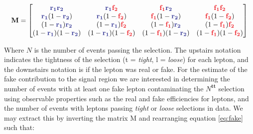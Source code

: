 \begin{equation}
\mathbf{M} = 
\begin{bmatrix}

\rone \rtwo          & \rone \ftwo         & \fone \rtwo         & \fone \ftwo \\
\rone (1-\rtwo )     & \rone (1-\ftwo )    & \fone (1- \rtwo )   & \fone (1- \ftwo ) \\
(1-\rone )\rtwo      & (1-\rone )\ftwo     & (1-\fone )\rtwo     & (1-\fone )\ftwo  \\
(1-\rone )(1-\rtwo ) & (1-\rone )(1-\ftwo )& (1-\fone )(1-\rtwo )& (1-\fone )(1-\ftwo )\\

\end{bmatrix}
\end{equation}

Where $N$ is the number of events passing the selection. The upstairs notation indicates the tightness of the selection (t = \emph{tight}, l = \emph{loose}) for each lepton, and the downstairs notation is if the lepton was real or fake. For the estimate of the fake contribution to the signal region we are interested in determining the number of events with at least one fake lepton contaminating the $N^{\mathbf{tt}}$ selection using observable properties such as the real and fake efficiencies for leptons, and the number of events with leptons passing \emph{tight} or \emph{loose} selections in data. We may extract this by inverting the matrix M and rearranging equation \ref{eq:fake} such that:

